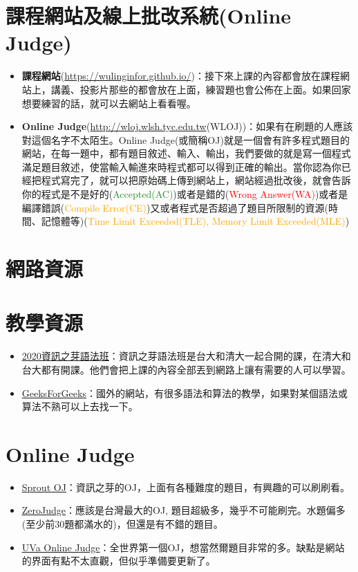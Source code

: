 \documentclass[a4paper, 11pt, oneside]{book}
\begin{document}
\section{課程網站及線上批改系統(Online Judge)}
\begin{itemize}
	\item \textbf{課程網站}(\url{https://wulinginfor.github.io/})：接下來上課的內容都會放在課程網站上，講義、投影片那些的都會放在上面，練習題也會公佈在上面。如果回家想要練習的話，就可以去網站上看看喔。
	\item \textbf{Online Judge}(\url{http://wloj.wlsh.tyc.edu.tw}(WLOJ))：如果有在刷題的人應該對這個名字不太陌生。Online Judge(或簡稱OJ)就是一個會有許多程式題目的網站，在每一題中，都有題目敘述、輸入、輸出，我們要做的就是寫一個程式滿足題目敘述，使當輸入輸進來時程式都可以得到正確的輸出。當你認為你已經把程式寫完了，就可以把原始碼上傳到網站上，網站經過批改後，就會告訴你的程式是不是好的(\textcolor{ForestGreen}{Accepted(AC)})或者是錯的(\textcolor{red}{Wrong Answer(WA)})或者是編譯錯誤(\textcolor{orange}{Compile Error(CE)})又或者程式是否超過了題目所限制的資源(時間、記憶體等)(\textcolor{orange}{Time Limit Exceeded(TLE), Memory Limit Exceeded(MLE)})
\end{itemize}

\section{網路資源}
\section{教學資源}
\begin{itemize}
\item \href{https://tw-csie-sprout.github.io/c2020/#!index.md}{\underline{2020資訊之芽語法班}}：資訊之芽語法班是台大和清大一起合開的課，在清大和台大都有開課。他們會把上課的內容全部丟到網路上讓有需要的人可以學習。
\item \href{www.geeksforgeeks.org}{\underline{GeeksForGeeks}}：國外的網站，有很多語法和算法的教學，如果對某個語法或算法不熟可以上去找一下。
\end{itemize}
\section{Online Judge}
\begin{itemize}
\item \href{https://neoj.sprout.tw/}{\underline{Sprout OJ}}：資訊之芽的OJ，上面有各種難度的題目，有興趣的可以刷刷看。
\item \href{https://zerojudge.tw}{\underline{ZeroJudge}}：應該是台灣最大的OJ, 題目超級多，幾乎不可能刷完。水題偏多(至少前30題都滿水的)，但還是有不錯的題目。
\item \href{https://onlinejudge.org/}{\underline{UVa Online Judge}}：全世界第一個OJ，想當然爾題目非常的多。缺點是網站的界面有點不太直觀，但似乎準備要更新了。
\end{itemize}
\end{document}
